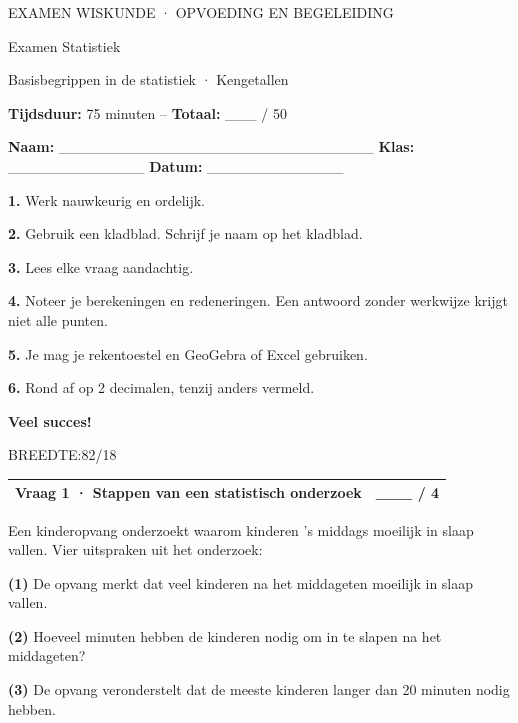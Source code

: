 \documentclass{article}
\newcommand{\breedtes}[1]{\par BREEDTE:#1\par}
\begin{document}
\begin{banner}
EXAMEN WISKUNDE \quad· OPVOEDING EN BEGELEIDING
\end{banner}

\begin{titel}
Examen Statistiek
\end{titel}

\begin{ondertitel}
Basisbegrippen in de statistiek · Kengetallen
\end{ondertitel}

\textbf{Tijdsduur:} 75 minuten – \textbf{Totaal:} \_\_\_ / 50

\textbf{Naam:} \_\_\_\_\_\_\_\_\_\_\_\_\_\_\_\_\_\_\_\_\_\_\_\_\_\_\_\_\_\_ \quad \textbf{Klas:} \_\_\_\_\_\_\_\_\_\_\_\_\_ \quad \textbf{Datum:} \_\_\_\_\_\_\_\_\_\_\_\_\_

\begin{letop}
\textbf{1.} Werk nauwkeurig en ordelijk.

\textbf{2.} Gebruik een kladblad. Schrijf je naam op het kladblad.

\textbf{3.} Lees elke vraag aandachtig.

\textbf{4.} Noteer je berekeningen en redeneringen. Een antwoord zonder werkwijze krijgt niet alle punten.

\textbf{5.} Je mag je rekentoestel en GeoGebra of Excel gebruiken.

\textbf{6.} Rond af op 2 decimalen, tenzij anders vermeld.
\end{letop}

\textbf{Veel succes!}

\breedtes{82/18}
\begin{tabular}{lc}
\hline
Vraag 1 · Stappen van een statistisch onderzoek & \_\_\_ / 4 \\
\hline
\end{tabular}

Een kinderopvang onderzoekt waarom kinderen ’s middags moeilijk in slaap vallen. Vier uitspraken uit het onderzoek:

\textbf{(1)} De opvang merkt dat veel kinderen na het middageten moeilijk in slaap vallen.

\textbf{(2)} Hoeveel minuten hebben de kinderen nodig om in te slapen na het middageten?

\textbf{(3)} De opvang veronderstelt dat de meeste kinderen langer dan 20 minuten nodig hebben.
\end{document}

